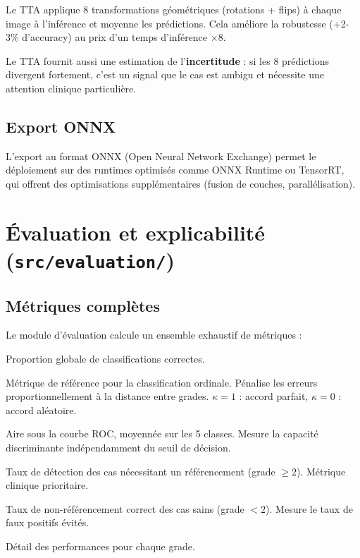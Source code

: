 ﻿\documentclass[11pt,a4paper]{article}
\begin{document}
Le TTA applique 8 transformations géométriques (rotations + flips) à chaque image à l'inférence et moyenne les prédictions. Cela améliore la robustesse (+2-3\% d'accuracy) au prix d'un temps d'inférence $\times 8$.

Le TTA fournit aussi une estimation de l'\textbf{incertitude} : si les 8 prédictions divergent fortement, c'est un signal que le cas est ambigu et nécessite une attention clinique particulière.

\subsection{Export ONNX}

L'export au format ONNX (Open Neural Network Exchange) permet le déploiement sur des runtimes optimisés comme ONNX Runtime ou TensorRT, qui offrent des optimisations supplémentaires (fusion de couches, parallélisation).

\section{Évaluation et explicabilité (\texttt{src/evaluation/})}

\subsection{Métriques complètes}

Le module d'évaluation calcule un ensemble exhaustif de métriques :

\begin{description}[leftmargin=2em]
  \item[Accuracy] Proportion globale de classifications correctes.
  \item[Quadratic Weighted Kappa] Métrique de référence pour la classification ordinale. Pénalise les erreurs proportionnellement à la distance entre grades. $\kappa = 1$ : accord parfait, $\kappa = 0$ : accord aléatoire.
  \item[AUC-ROC macro] Aire sous la courbe ROC, moyennée sur les 5 classes. Mesure la capacité discriminante indépendamment du seuil de décision.
  \item[Sensibilité ``referable''] Taux de détection des cas nécessitant un référencement (grade $\geq 2$). Métrique clinique prioritaire.
  \item[Spécificité ``referable''] Taux de non-référencement correct des cas sains (grade $< 2$). Mesure le taux de faux positifs évités.
  \item[Précision, Rappel, F1 par classe] Détail des performances pour chaque grade.
\end{description}
\end{document}
